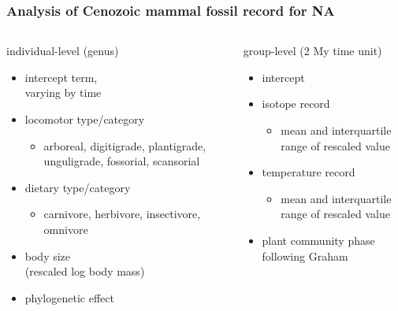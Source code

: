 \documentclass{beamer}
\begin{document}
\begin{frame}
  \frametitle{Analysis of Cenozoic mammal fossil record for NA}
  \begin{columns}
    \begin{column}{0.5\textwidth}
      individual-level (genus)
      \begin{itemize}
        \item intercept term, \\varying by time
        \item locomotor type/category
          \begin{itemize}
            \item arboreal, digitigrade, plantigrade, unguligrade, fossorial, scansorial
          \end{itemize}
        \item dietary type/category
          \begin{itemize}
            \item carnivore, herbivore, insectivore, omnivore
          \end{itemize}
        \item body size \\(rescaled log body mass)
        \item phylogenetic effect
      \end{itemize}
    \end{column}
    \begin{column}{0.5\textwidth}
      group-level (2 My time unit)
      \begin{itemize}
        \item intercept
        \item isotope record
          \begin{itemize}
            \item mean and interquartile range of rescaled value
          \end{itemize}
        \item temperature record
          \begin{itemize}
            \item mean and interquartile range of rescaled value
          \end{itemize}
        \item plant community phase following Graham
      \end{itemize}
    \end{column}
  \end{columns}
\end{frame}
\end{document}
